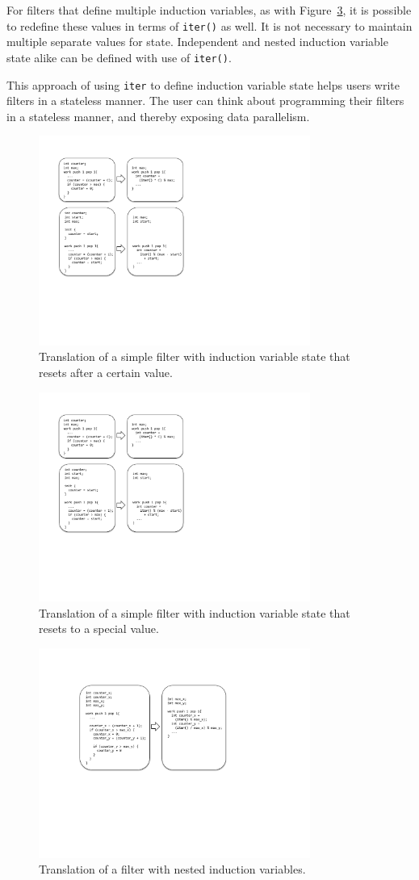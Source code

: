 For filters that define multiple induction variables, as with Figure~\ref{fig:transform-after-twonested}, it is possible to redefine these values in terms of {\tt iter()} as well.  It is not necessary to maintain multiple separate values for state.  Independent and nested induction variable state alike can be defined with use of {\tt iter()}.

This approach of using {\tt iter} to define induction variable state helps users write filters in a stateless manner.  The user can think about programming their filters in a stateless manner, and thereby exposing data parallelism. 



\begin{figure}[t]
\includegraphics[width=3.5in]{figures/transformation1.pdf}
\caption{Translation of a simple filter with induction variable state that resets after a certain value. \protect\label{fig:transform-after-simple}}
\end{figure}

\begin{figure}[t]
\includegraphics[width=3.5in]{figures/transformation2.pdf}
\caption{Translation of a simple filter with induction variable state that resets to a special value. \protect\label{fig:transform-after-start}}
\end{figure}

\begin{figure}[t]
\includegraphics[width=3.5in]{figures/transformation3.pdf}
\caption{Translation of a filter with nested induction variables. \protect\label{fig:transform-after-twonested}}
\end{figure}
